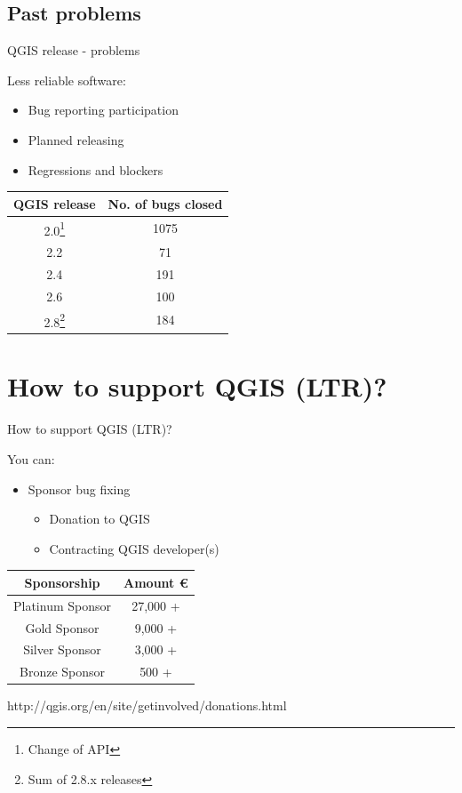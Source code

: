 \subsection{Past problems}
\begin{frame}{QGIS release - problems}
	\begin{block}{Less reliable software:}
		\begin{itemize}
			\item Bug reporting participation
			\item Planned releasing 
			\item Regressions and blockers
		\end{itemize}
	\end{block}
	\begin{center}
		
		\begin{tabular}{|c|c|}
			\hline QGIS release & No. of bugs closed \\ 
			\hline 2.0\footnote{Change of API} & 1075 \\ 
			\hline 2.2 & 71 \\ 
			\hline 2.4 & 191 \\ 
			\hline 2.6 & 100 \\ 
			\hline 2.8\footnote{Sum of 2.8.x releases} & 184 \\ 
			\hline 
		\end{tabular}
	\end{center} 
\end{frame}


\section{How to support QGIS (LTR)?}

\begin{frame}{How to support QGIS (LTR)?}
	\begin{block}{You can:}
		\begin{itemize}
			\item Sponsor bug fixing
				\begin{itemize}
					\item Donation to QGIS
					\item Contracting QGIS developer(s)
				\end{itemize}
		\end{itemize}
	\end{block}
	
	\begin{center}
		\begin{tabular}{|c|c|}
			\hline Sponsorship & Amount \euro \\ 
			\hline Platinum Sponsor & 27,000 + \\ 
			\hline Gold Sponsor & 9,000 +  \\ 
			\hline Silver Sponsor & 3,000 + \\ 
			\hline Bronze Sponsor & 500 + \\ 
			\hline 
		\end{tabular}
	\end{center}
	
	http://qgis.org/en/site/getinvolved/donations.html
\end{frame}

